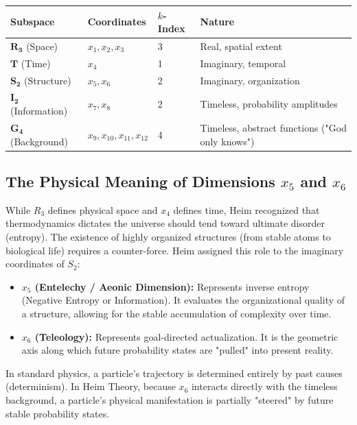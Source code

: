 \documentclass[11pt,a4paper,oneside]{article}
\begin{document}
\begin{table}[htbp]
\centering
\renewcommand{\arraystretch}{1.5}
\begin{tabular}{llll}
\toprule
\textbf{Subspace} & \textbf{Coordinates} & \textbf{$k$-Index} & \textbf{Nature} \\
\midrule
\rowcolor{theoryblue!5}
$\mathbf{R_3}$ (Space) & $x_1, x_2, x_3$ & 3 & Real, spatial extent \\
$\mathbf{T}$ (Time) & $x_4$ & 1 & Imaginary, temporal \\
$\mathbf{S_2}$ (Structure) & $x_5, x_6$ & 2 & Imaginary, organization \\
\rowcolor{theorygray}
$\mathbf{I_2}$ (Information) & $x_7, x_8$ & 2 & Timeless, probability amplitudes \\
\rowcolor{theorygray}
$\mathbf{G_4}$ (Background) & $x_9, x_{10}, x_{11}, x_{12}$ & 4 & Timeless, abstract functions ("God only knows") \\
\bottomrule
\end{tabular}
\end{table}
\subsection{The Physical Meaning of Dimensions \texorpdfstring{$x_5$}{x5} and \texorpdfstring{$x_6$}{x6}}
While $R_3$ defines physical space and $x_4$ defines time, Heim recognized that thermodynamics dictates the universe should tend toward ultimate disorder (entropy). The existence of highly organized structures (from stable atoms to biological life) requires a counter-force. Heim assigned this role to the imaginary coordinates of $S_2$:
\begin{itemize}
    \item \textbf{$x_5$ (Entelechy / Aeonic Dimension):} Represents inverse entropy (Negative Entropy or Information). It evaluates the organizational quality of a structure, allowing for the stable accumulation of complexity over time.
    \item \textbf{$x_6$ (Teleology):} Represents goal-directed actualization. It is the geometric axis along which future probability states are "pulled" into present reality. 
\end{itemize}
In standard physics, a particle's trajectory is determined entirely by past causes (determinism). In Heim Theory, because $x_6$ interacts directly with the timeless background, a particle's physical manifestation is partially "steered" by future stable probability states.
\end{document}
